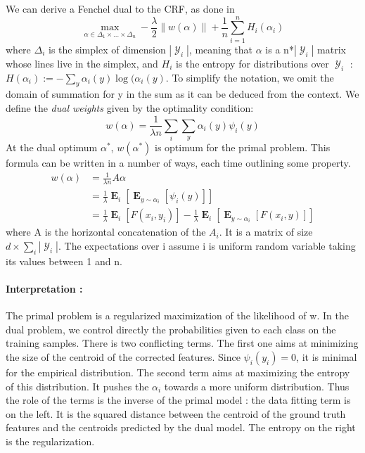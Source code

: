 \documentclass{article}
\DeclareMathOperator{\E}{\mathbf{E}}
\DeclareMathOperator{\Y}{\mathcal{Y}}
\begin{document}
We can derive a Fenchel dual to the CRF, as done in 
\begin{equation}
	\max_{\alpha\in\Delta_{1} \times \dots \times \Delta_{n}} -\frac{\lambda}{2}\|w(\alpha)\| +\frac{1}{n} \sum_{i=1}^n H_i(\alpha_i)
\end{equation}
where $\Delta_i$ is the simplex of dimension $|\Y_i|$, meaning that $\alpha$ is a n*$|\Y_i|$ matrix whose lines live in the simplex, and $H_i$ is the entropy for distributions over $\Y_i$ : $H(\alpha_i) := - \sum_y \alpha_i(y) \log(\alpha_i(y)$.
To simplify the notation, we omit the domain of summation for y in the sum as it can be deduced from the context.
We define the \textit{dual weights} given by the optimality condition:
\begin{equation*}
	w(\alpha) = \frac{1}{\lambda n} \sum_i \sum_y \alpha_i(y) \psi_i(y) 
\end{equation*}
At the dual optimum $\alpha^*$, $w(\alpha^*)$ is optimum for the primal problem.
This formula can be written in a number of ways, each time outlining some property.
\begin{align}
	w(\alpha) & = \frac{1}{\lambda n} A \alpha \label{linear combination of probabilities} \\
	 & = \frac{1}{\lambda} \E_{i} [ \E_{y \sim \alpha_i} [\psi_i(y)]] \label{mean of the corrected features} \\
	 & =   \frac{1}{\lambda} \E_{i} [F(x_i, y_i)] - \frac{1}{\lambda} \E_{i} [ \E_{y \sim \alpha_i} [F(x_i, y)]]
	 \label{difference between ground truth and dual weights}
\end{align}
where A is the horizontal concatenation of the $A_i$.
It is a matrix of size $d \times \sum_i |\Y_i|$.
The expectations over i assume i is uniform random variable taking its values between 1 and n. 

\paragraph{Interpretation :} The primal problem is a regularized maximization of the likelihood of w. 
In the dual problem, we control directly the probabilities given to each class on the training samples.
There is two conflicting terms.
The first one aims at minimizing the size of the centroid of the corrected features.
Since $\psi_i(y_i)=0$, it is minimal for the empirical distribution.
The second term aims at maximizing the entropy of this distribution.
It pushes the $\alpha_i$ towards a more uniform distribution.
Thus the role of the terms is the inverse of the primal model : the data fitting term is on the left.
It is the squared distance between the centroid of the ground truth features and the centroids predicted by the dual model.
The entropy on the right is the regularization. 
\end{document}

